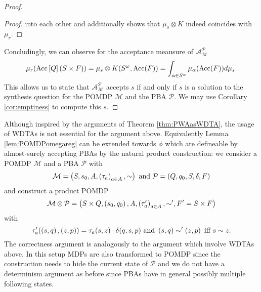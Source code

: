 \begin{proof}
\begin{proof}
    into each other and additionally shows that $\mu_{s}\otimes K$ indeed
    coincides with $\mu_{r}$.
  \end{proof}
  Concludingly, we can observe for the acceptance meausure of 
  $\mathcal{A}_{\mathcal{M}}^{\mathcal{P}}$ 
  \begin{equation*}
    \mu_{r}(\operatorname{Acc}\left[Q\right](S\times F))  
    = \mu_{s}\otimes K(S^{\omega}, \operatorname{Acc}(F))
    = \int_{\alpha\in S^{\omega}}\mu_{\alpha}(\operatorname{Acc}(F)) d\mu_{s}.
  \end{equation*}
  This allows us to state that $\mathcal{A}_{\mathcal{M}}^{\mathcal{P}}$ 
  accepts $s$ if and only if $s$ is a solution to the synthesis question for 
  the \ac{POMDP} $\mathcal{M}$ and the \ac{PBA} $\mathcal{P}$. We may use
  Corollary \ref{cor:emptiness} to compute this $s$.
\end{proof}
Although inspired by the arguments of Theorem \ref{thm:PWAasWDTA}, the usage 
of \acp{WDTA} is not essential for the argument above. Equivalently Lemma 
\ref{lem:POMDPomegareg} can be extended towards $\phi$ which
are defineable by almost-surely accepting \acp{PBA} by the natural product 
construction: we consider a \ac{POMDP} $\mathcal{M}$ and a \ac{PBA} 
$\mathcal{P}$ with
\begin{equation*}
  \mathcal{M} = \left(S, s_{0}, A, \left(\tau_{a}\right)_{a\in A}, \sim\right)
  \text{ and }
  \mathcal{P} = \left(Q, q_{0}, S, \delta, F\right)
\end{equation*}
and construct a product \ac{POMDP}
\begin{equation*}
  \mathcal{M}\otimes\mathcal{P} = \left(S\times Q, \left(s_{0}, q_{0}\right), A,
    \left(\tau'_{a}\right)_{a\in A}, \sim', F' = S\times F\right)
\end{equation*}
with
\begin{equation*}
  \tau'_{a}(\left(s, q\right), \left(z, p\right)) = \tau_{a}(s, z)\cdot\delta(q, s, p)
  \text{ and }
  \left(s, q\right)\sim'\left(z, p\right)\text{ iff }s\sim z.
\end{equation*}
The correctness argument is analogously to the argument which involve 
\acp{WDTA} above. In this setup \acp{MDP} are also transformed to \ac{POMDP} 
since the construction needs to hide the current state of $\mathcal{P}$ and we
do not have a determinism argument as before since \acp{PBA} have in general
possibly multiple following states.
